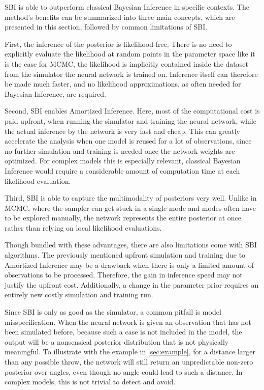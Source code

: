 SBI is able to outperform classical Bayesian Inference in specific contexts.
The method's benefits can be summarized into three main concepts, which are presented in this section, followed by common limitations of SBI.

First, the inference of the posterior is likelihood-free.
There is no need to explicitly evaluate the likelihood at random points in the parameter space like it is the case for MCMC, the likelihood is implicitly contained inside the dataset from the simulator the neural network is trained on.
Inference itself can therefore be made much faster, and no likelihood approximations, as often needed for Bayesian Inference, are required.

Second, SBI enables Amortized Inference.
Here, most of the computational cost is paid upfront, when running the simulator and training the neural network, while the actual inference by the network is very fast and cheap.
This can greatly accelerate the analysis when one model is reused for a lot of observations, since no further simulation and training is needed once the network weights are optimized.
For complex models this is especially relevant, classical Bayesian Inference would require a considerable amount of computation time at each likelihood evaluation.

Third, SBI is able to capture the multimodality of posteriors very well. 
Unlike in MCMC, where the sampler can get stuck in a single mode and modes often have to be explored manually, the network represents the entire posterior at once rather than relying on local likelihood evaluations.

Though bundled with these advantages, there are also limitations come with SBI algorithms.
The previously mentioned upfront simulation and training due to Amortized Inference may be a drawback when there is only a limited amount of observations to be processed.
Therefore, the gain in inference speed may not justify the upfront cost.
Additionally, a change in the parameter prior requires an entirely new costly simulation and training run.

Since SBI is only as good as the simulator, a common pitfall is model misspecification.
When the neural network is given an observation that has not been simulated before, because such a case is not included in the model, the output will be a nonsensical posterior distribution that is not physically meaningful.
To illustrate with the example in \cref{sec:example}, for a distance larger than any possible throw, the network will still return an unpredictable non-zero posterior over angles, even though no angle could lead to such a distance.
In complex models, this is not trivial to detect and avoid.

